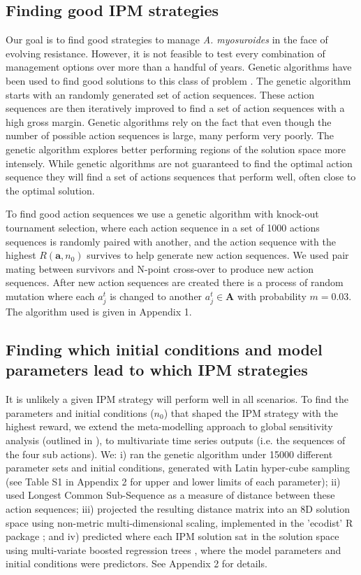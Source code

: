 \documentclass[12pt, a4paper]{article}
\begin{document}
\subsection*{Finding good IPM strategies} 
Our goal is to find good strategies to manage \textit{A. myosuroides} in the face of evolving resistance. However, it is not feasible to test every combination of management options over more than a handful of years. Genetic algorithms have been used to find good solutions to this class of problem \citep{Tayl2004GA, Carr2010}. The genetic algorithm starts with an randomly generated set of action sequences. These action sequences are then iteratively improved to find a set of action sequences with a high gross margin. Genetic algorithms rely on the fact that even though the number of possible action sequences is large, many perform very poorly. The genetic algorithm explores better performing regions of the solution space more intensely. While genetic algorithms are not guaranteed to find the optimal action sequence they will find a set of actions sequences that perform well, often close to the optimal solution.   

To find good action sequences we use a genetic algorithm with knock-out tournament selection, where each action sequence in a set of 1000 actions sequences is randomly paired with another, and the action sequence with the highest $R(\mathbf{a}, n_0)$ survives to help generate new action sequences. We used pair mating between survivors and N-point cross-over to produce new action sequences. After new action sequences are created there is a process of random mutation where each $a_j^t$ is changed to another $a_j^t \in \mathbf{A}$ with probability $m = 0.03$. The algorithm used is given in Appendix 1.        

\subsection*{Finding which initial conditions and model parameters lead to which IPM strategies}
It is unlikely a given IPM strategy will perform well in all scenarios. To find the parameters and initial conditions ($n_0$) that shaped the IPM strategy with the highest reward, we extend the meta-modelling approach to global sensitivity analysis (outlined in \citep{Cout2014}), to multivariate time series outputs (i.e. the sequences of the four sub actions). We: i) ran the genetic algorithm under 15000 different parameter sets and initial conditions, generated with Latin hyper-cube sampling (see Table S1 in Appendix 2 for upper and lower limits of each parameter); ii) used Longest Common Sub-Sequence \citep{Tooh2015} as a measure of distance between these action sequences; iii) projected the resulting distance matrix into an 8D solution space using non-metric multi-dimensional scaling, implemented in the 'ecodist' R package \citep{Gosl2007}; and iv) predicted where each IPM solution sat in the solution space using multi-variate boosted regression trees \citep{Mill2016}, where the model parameters and initial conditions were predictors. See Appendix 2 for details.
\end{document}
